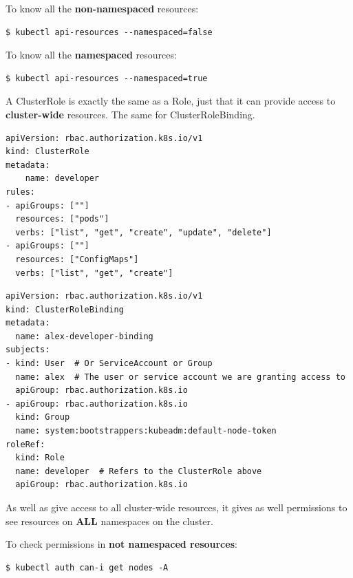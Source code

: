 \documentclass{article}
\newenvironment{blocktemplateII}[1]{%
    \tcolorbox[beamer,%
    noparskip,breakable,
    colframe=Green,%
    colbacklower=LimeGreen!75!LightGreen,%
    title=#1]}%
    {\endtcolorbox}
\newenvironment{codetemplate}[1][]{%
  \mybasecolorbox[#1]
  \itshape
}{%
  \endmybasecolorbox
}
\begin{document}
To know all the \textbf{non-namespaced} resources:
\begin{codetemplate}{}
\begin{verbatim}
$ kubectl api-resources --namespaced=false
\end{verbatim}
\end{codetemplate}

To know all the \textbf{namespaced} resources:
\begin{codetemplate}{}
\begin{verbatim}
$ kubectl api-resources --namespaced=true
\end{verbatim}
\end{codetemplate}

A ClusterRole is exactly the same as a Role, just that it can provide access to \textbf{cluster-wide} resources. The same for ClusterRoleBinding.

\begin{codetemplate}{}
\begin{verbatim}
apiVersion: rbac.authorization.k8s.io/v1
kind: ClusterRole
metadata:
    name: developer
rules:
- apiGroups: [""]
  resources: ["pods"]
  verbs: ["list", "get", "create", "update", "delete"]
- apiGroups: [""]
  resources: ["ConfigMaps"]
  verbs: ["list", "get", "create"]
\end{verbatim}
\end{codetemplate}

\begin{codetemplate}{}
\begin{verbatim}
apiVersion: rbac.authorization.k8s.io/v1
kind: ClusterRoleBinding
metadata:
  name: alex-developer-binding
subjects:
- kind: User  # Or ServiceAccount or Group
  name: alex  # The user or service account we are granting access to
  apiGroup: rbac.authorization.k8s.io
- apiGroup: rbac.authorization.k8s.io
  kind: Group
  name: system:bootstrappers:kubeadm:default-node-token
roleRef:
  kind: Role
  name: developer  # Refers to the ClusterRole above
  apiGroup: rbac.authorization.k8s.io
\end{verbatim}
\end{codetemplate}

\begin{blocktemplateII}{NOTE}
As well as give access to all cluster-wide resources, it gives as well permissions to see resources on \textbf{ALL} namespaces on the cluster.
\end{blocktemplateII}

To check permissions in \textbf{not namespaced resources}:
\begin{codetemplate}{}
\begin{verbatim}
$ kubectl auth can-i get nodes -A
\end{verbatim}
\end{codetemplate}
\end{document}
